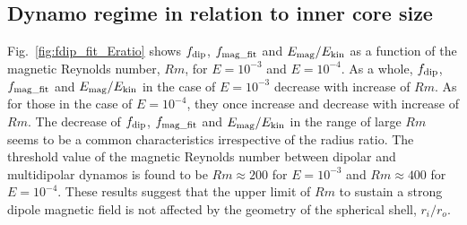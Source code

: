\subsection{Dynamo regime in relation to inner core size}
\label{subsec:dynamo_regime}
Fig.~\ref{fig:fdip_fit_Eratio} shows $f_{\rm dip}$, $f_{\rm mag\_fit}$ and $E_{\rm mag} / E_{\rm kin}$ as a function of the magnetic Reynolds number, $Rm$, for $E = 10^{-3}$ and $E = 10^{-4}$.
As a whole, $f_{\rm dip}$, $f_{\rm mag\_fit}$ and $E_{\rm mag} / E_{\rm kin}$ in the case of $E = 10^{-3}$ decrease with increase of $Rm$.
As for those in the case of $E = 10^{-4}$, they once increase and decrease with increase of $Rm$.
The decrease of $f_{\rm dip}$, $f_{\rm mag\_fit}$ and $E_{\rm mag} / E_{\rm kin}$ in the range of large $Rm$ seems to be a common characteristics irrespective of the radius ratio.
The threshold value of the magnetic Reynolds number between dipolar and multidipolar dynamos is found to be $Rm \approx 200$ for $E = 10^{-3}$ and $Rm \approx 400$ for $E = 10^{-4}$.
These results suggest that the upper limit of $Rm$ to sustain a strong dipole magnetic field is not affected by the geometry of the spherical shell, $r_i / r_o$.



